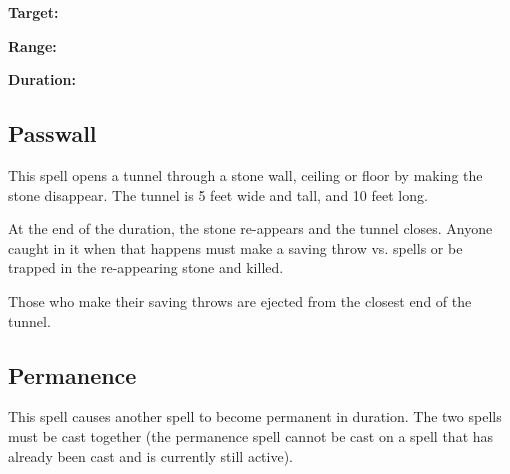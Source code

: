 \begin{multicols*}{2}
{\textbf{Target:}

\textbf{Range:}

\textbf{Duration:} }


\subsection{Passwall}\label{spell:Passwall}

This spell opens a tunnel through a stone wall, ceiling or floor by making the stone disappear. The tunnel is 5 feet wide and tall, and 10 feet long.

At the end of the duration, the stone re-appears and the tunnel closes. Anyone caught in it when that happens must make a saving throw vs. spells or be trapped in the re-appearing stone and killed.

Those who make their saving throws are ejected from the closest end of the tunnel.

\subsection{Permanence}\label{spell:Permanence}

This spell causes another spell to become permanent in duration. The two spells must be cast together (the permanence spell cannot be cast on a spell that has already been cast and is currently still active).


\end{multicols*}
